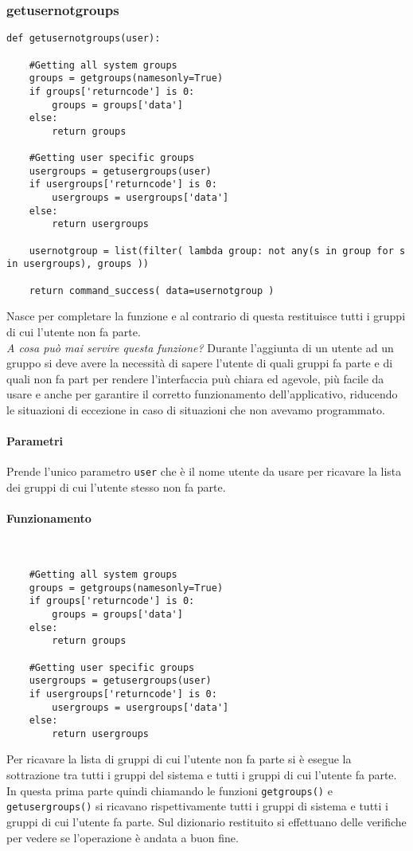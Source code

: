 \documentclass[11pt]{article}
\begin{document}
\subsubsection{getusernotgroups}\label{getusernotgroups}
\begin{lstlisting}
def getusernotgroups(user):
    
    #Getting all system groups
    groups = getgroups(namesonly=True)
    if groups['returncode'] is 0:
        groups = groups['data']
    else:
        return groups

    #Getting user specific groups
    usergroups = getusergroups(user)
    if usergroups['returncode'] is 0:
        usergroups = usergroups['data']
    else:
        return usergroups

    usernotgroup = list(filter( lambda group: not any(s in group for s in usergroups), groups ))

    return command_success( data=usernotgroup )
\end{lstlisting}
Nasce per completare la funzione  e al contrario di questa restituisce tutti i gruppi di cui
l'utente non fa parte.\\
\textit{A cosa può mai servire questa funzione?}
Durante l'aggiunta di un utente ad un gruppo si deve avere la necessità di sapere l'utente di quali gruppi
fa parte e di quali non fa part per rendere l'interfaccia puù chiara ed agevole, più facile da usare e anche
per garantire il corretto funzionamento dell'applicativo, riducendo le situazioni di eccezione in caso di
situazioni che non avevamo programmato.
\paragraph{Parametri}
Prende l'unico parametro \texttt{user} che è il nome utente da usare per ricavare la lista dei gruppi di cui l'utente stesso
non fa parte.
\paragraph{Funzionamento}
~\\
\begin{lstlisting}
    #Getting all system groups
    groups = getgroups(namesonly=True)
    if groups['returncode'] is 0:
        groups = groups['data']
    else:
        return groups

    #Getting user specific groups
    usergroups = getusergroups(user)
    if usergroups['returncode'] is 0:
        usergroups = usergroups['data']
    else:
        return usergroups

\end{lstlisting}
Per ricavare la lista di gruppi di cui l'utente non fa parte si è esegue la sottrazione tra tutti i gruppi 
del sistema e tutti i gruppi di cui l'utente fa parte.\\
In questa prima parte quindi chiamando le funzioni \texttt{getgroups()} e \texttt{getusergroups()} si ricavano
rispettivamente tutti i gruppi di sistema e tutti i gruppi di cui l'utente fa parte.
Sul dizionario restituito si effettuano delle verifiche per vedere se l'operazione è andata a buon fine.\\
\end{document}
